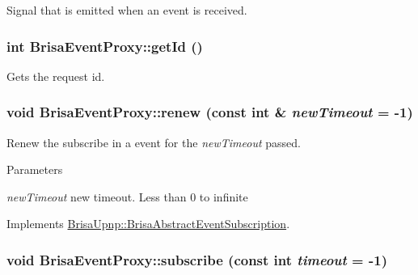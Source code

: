 Signal that is emitted when an event is received. \hypertarget{classBrisaUpnp_1_1BrisaEventProxy_ab4e837e9edf3d2e12e5b4d0971deca04}{
\subsubsection[{getId}]{\setlength{\rightskip}{0pt plus 5cm}int BrisaEventProxy::getId ()}}
\label{classBrisaUpnp_1_1BrisaEventProxy_ab4e837e9edf3d2e12e5b4d0971deca04}


Gets the request id. \hypertarget{classBrisaUpnp_1_1BrisaEventProxy_a9f700f55e37b646bf2cb2c26b98707d8}{
\subsubsection[{renew}]{\setlength{\rightskip}{0pt plus 5cm}void BrisaEventProxy::renew (const int \& {\em newTimeout} = {\ttfamily -\/1})}}
\label{classBrisaUpnp_1_1BrisaEventProxy_a9f700f55e37b646bf2cb2c26b98707d8}


Renew the subscribe in a event for the {\itshape newTimeout\/} passed. 
\begin{DoxyParams}{Parameters}
\item[{\em newTimeout}]new timeout. Less than 0 to infinite \end{DoxyParams}


Implements \hyperlink{classBrisaUpnp_1_1BrisaAbstractEventSubscription_ae9da94244c6164b5759b8be21e03d42f}{BrisaUpnp::BrisaAbstractEventSubscription}.\hypertarget{classBrisaUpnp_1_1BrisaEventProxy_ab22e72391031e2e388399065df45b609}{
\subsubsection[{subscribe}]{\setlength{\rightskip}{0pt plus 5cm}void BrisaEventProxy::subscribe (const int {\em timeout} = {\ttfamily -\/1})}}
\label{classBrisaUpnp_1_1BrisaEventProxy_ab22e72391031e2e388399065df45b609}


